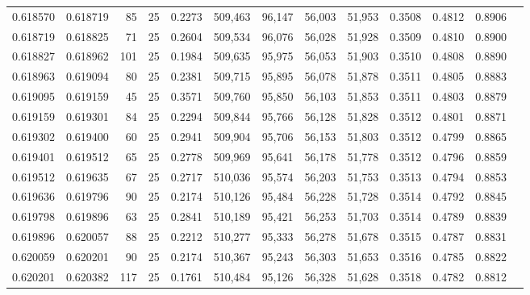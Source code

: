 \begin{tabular}{rrrrrrrrrrrrr}
0.618570 & 0.618719 &    85 &  25 &                                     0.2273 & 509,463 &  96,147 &  56,003 &  51,953 & 0.3508 & 0.4812 & 0.8906 \\
0.618719 & 0.618825 &    71 &  25 &                                     0.2604 & 509,534 &  96,076 &  56,028 &  51,928 & 0.3509 & 0.4810 & 0.8900 \\
0.618827 & 0.618962 &   101 &  25 &                                     0.1984 & 509,635 &  95,975 &  56,053 &  51,903 & 0.3510 & 0.4808 & 0.8890 \\
0.618963 & 0.619094 &    80 &  25 &                                     0.2381 & 509,715 &  95,895 &  56,078 &  51,878 & 0.3511 & 0.4805 & 0.8883 \\
0.619095 & 0.619159 &    45 &  25 &                                     0.3571 & 509,760 &  95,850 &  56,103 &  51,853 & 0.3511 & 0.4803 & 0.8879 \\
0.619159 & 0.619301 &    84 &  25 &                                     0.2294 & 509,844 &  95,766 &  56,128 &  51,828 & 0.3512 & 0.4801 & 0.8871 \\
0.619302 & 0.619400 &    60 &  25 &                                     0.2941 & 509,904 &  95,706 &  56,153 &  51,803 & 0.3512 & 0.4799 & 0.8865 \\
0.619401 & 0.619512 &    65 &  25 &                                     0.2778 & 509,969 &  95,641 &  56,178 &  51,778 & 0.3512 & 0.4796 & 0.8859 \\
0.619512 & 0.619635 &    67 &  25 &                                     0.2717 & 510,036 &  95,574 &  56,203 &  51,753 & 0.3513 & 0.4794 & 0.8853 \\
0.619636 & 0.619796 &    90 &  25 &                                     0.2174 & 510,126 &  95,484 &  56,228 &  51,728 & 0.3514 & 0.4792 & 0.8845 \\
0.619798 & 0.619896 &    63 &  25 &                                     0.2841 & 510,189 &  95,421 &  56,253 &  51,703 & 0.3514 & 0.4789 & 0.8839 \\
0.619896 & 0.620057 &    88 &  25 &                                     0.2212 & 510,277 &  95,333 &  56,278 &  51,678 & 0.3515 & 0.4787 & 0.8831 \\
0.620059 & 0.620201 &    90 &  25 &                                     0.2174 & 510,367 &  95,243 &  56,303 &  51,653 & 0.3516 & 0.4785 & 0.8822 \\
0.620201 & 0.620382 &   117 &  25 &                                     0.1761 & 510,484 &  95,126 &  56,328 &  51,628 & 0.3518 & 0.4782 & 0.8812 \\

\end{tabular}
